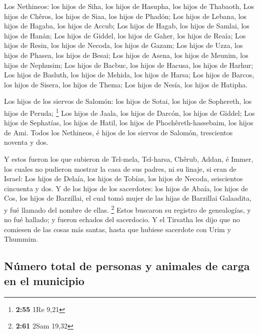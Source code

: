  Los Nethineos: los hijos de Siha, los hijos de Hasupha,
los hijos de Thabaoth,  Los hijos de Chêros, los hijos de
Siaa, los hijos de Phadón;  Los hijos de Lebana, los hijos
de Hagaba, los hijos de Accub;  Los hijos de Hagab, los
hijos de Samlai, los hijos de Hanán;  Los hijos de Giddel,
los hijos de Gaher, los hijos de Reaía;  Los hijos de
Resin, los hijos de Necoda, los hijos de Gazam;  Los hijos
de Uzza, los hijos de Phasea, los hijos de Besai;  Los
hijos de Asena, los hijos de Meunim, los hijos de Nephusim;
 Los hijos de Bacbuc, los hijos de Hacusa, los hijos de
Harhur;  Los hijos de Basluth, los hijos de Mehida, los
hijos de Harsa;  Los hijos de Barcos, los hijos de Sisera,
los hijos de Thema;  Los hijos de Nesía, los hijos de
Hatipha.

 Los hijos de los siervos de Salomón: los hijos de Sotai,
los hijos de Sophereth, los hijos de Peruda; \footnote{\textbf{2:55} 1Re
  9,21}  Los hijos de Jaala, los hijos de Darcón, los hijos
de Giddel;  Los hijos de Sephatías, los hijos de Hatil, los
hijos de Phochêreth-hassebaim, los hijos de Ami.  Todos los
Nethineos, é hijos de los siervos de Salomón, trescientos noventa y dos.

 Y estos fueron los que subieron de Tel-mela, Tel-harsa,
Chêrub, Addan, é Immer, los cuales no pudieron mostrar la casa de sus
padres, ni su linaje, si eran de Israel:  Los hijos de
Delaía, los hijos de Tobías, los hijos de Necoda, seiscientos cincuenta
y dos.  Y de los hijos de los sacerdotes: los hijos de
Abaía, los hijos de Cos, los hijos de Barzillai, el cual tomó mujer de
las hijas de Barzillai Galaadita, y fué llamado del nombre de ellas.
\footnote{\textbf{2:61} 2Sam 19,32}  Estos buscaron su
registro de genealogías, y no fué hallado; y fueron echados del
sacerdocio.  Y el Tirsatha les dijo que no comiesen de las
cosas más santas, hasta que hubiese sacerdote con Urim y Thummim.

\hypertarget{nuxfamero-total-de-personas-y-animales-de-carga-en-el-municipio}{%
\subsection{Número total de personas y animales de carga en el
municipio}\label{nuxfamero-total-de-personas-y-animales-de-carga-en-el-municipio}}

